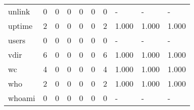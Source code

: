 \begin{longtable}{lp{2.0cm}p{2.0cm}p{2.0cm}p{2.0cm}p{2.0cm}p{2.0cm}p{2.0cm}p{2.0cm}p{2.0cm}}
unlink    &                      0 &                                             0 &                                            0 &                                           0 &                                            0 &                                          0 &                                    - &                                      - &                                    - \\
uptime    &                      2 &                                             0 &                                            0 &                                           0 &                                            0 &                                          2 &                                1.000 &                                  1.000 &                                1.000 \\
users     &                      0 &                                             0 &                                            0 &                                           0 &                                            0 &                                          0 &                                    - &                                      - &                                    - \\
vdir      &                      6 &                                             0 &                                            0 &                                           0 &                                            0 &                                          6 &                                1.000 &                                  1.000 &                                1.000 \\
wc        &                      4 &                                             0 &                                            0 &                                           0 &                                            0 &                                          4 &                                1.000 &                                  1.000 &                                1.000 \\
who       &                      2 &                                             0 &                                            0 &                                           0 &                                            0 &                                          2 &                                1.000 &                                  1.000 &                                1.000 \\
whoami    &                      0 &                                             0 &                                            0 &                                           0 &                                            0 &                                          0 &                                    - &                                      - &                                    - \\

\end{longtable}
